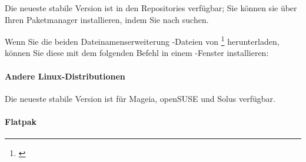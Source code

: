 Die neueste stabile Version ist in den Repositories verfügbar; Sie können sie über Ihren Paketmanager installieren, indem Sie nach  suchen.

Wenn Sie die beiden \gls{Dateinamenserweiterung} -Dateien von \footnote{\label{fn:sourceforgeStable}\urlSourceForgeGrisbiStable} herunterladen, können Sie diese mit dem folgenden Befehl in einem -Fenster installieren:


\paragraph{Andere Linux-Distributionen}\mbox{}		%

Die neueste stabile Version ist für Mageia, openSUSE und Solus verfügbar.

\paragraph{Flatpak}\mbox{}		%

